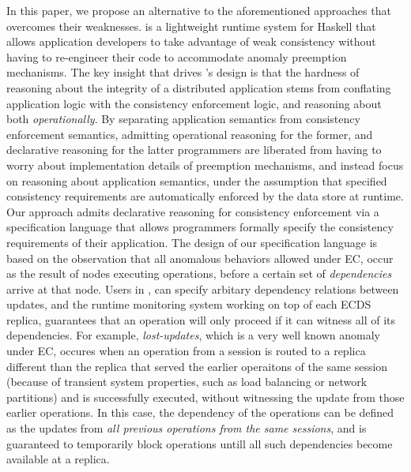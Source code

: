 %
%

In this paper, we propose an alternative to the aforementioned
approaches that overcomes their weaknesses.  \tool is a lightweight
runtime system for Haskell that allows application developers to take
advantage of weak consistency without having to re-engineer their code
to accommodate anomaly preemption mechanisms.  The key insight that
drives \tool's design is that the hardness of reasoning about the
integrity of a distributed application stems from conflating
application logic with the consistency enforcement logic, and reasoning
about both \emph{operationally}.  By separating application semantics
from consistency enforcement semantics, admitting operational
reasoning for the former, and declarative reasoning for the latter
programmers are liberated from having to worry about implementation details of
preemption mechanisms, and instead focus on reasoning about
application semantics, under the assumption that specified consistency
requirements are automatically enforced by the data store at runtime.  
%
Our approach admits declarative reasoning for consistency enforcement via
a specification language that allows programmers formally specify the
consistency requirements of their application. 
The design of our
specification language is based on the observation that all
anomalous behaviors allowed under EC, occur as 
the result of nodes executing operations, before a certain set of
\emph{dependencies} arrive at that node. 
Users in \tool, can
specify arbitary dependency relations between updates, and the 
runtime monitoring system working on top of each ECDS replica, guarantees that an 
operation will only proceed if it can witness all of its dependencies. 
For example, \emph{lost-updates}, which is a very well known anomaly
under EC, occures when an operation from a session
is routed to a replica different than the replica that served the earlier
operaitons of the same session (because of transient system
properties, such as load balancing or network partitions)
and is successfully executed, without witnessing the update from those
earlier  operations.
In this case, the dependency of the operations can be defined as the
updates from \emph{all previous operations from the same sessions}, and
\tool is guaranteed to temporarily block operations untill all such
dependencies become available at a replica.

%
%

